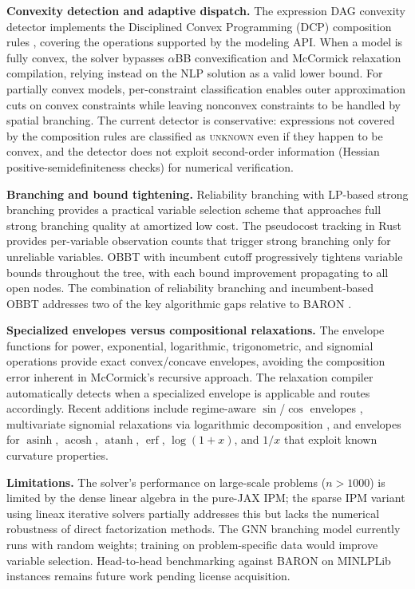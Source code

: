\documentclass[12pt,preprint]{article}
\begin{document}
\textbf{Convexity detection and adaptive dispatch.} The expression DAG convexity detector implements the Disciplined Convex Programming (DCP) composition rules \cite{Boyd2004}, covering the operations supported by the modeling API. When a model is fully convex, the solver bypasses $\alpha$BB convexification and McCormick relaxation compilation, relying instead on the NLP solution as a valid lower bound. For partially convex models, per-constraint classification enables outer approximation cuts on convex constraints while leaving nonconvex constraints to be handled by spatial branching. The current detector is conservative: expressions not covered by the composition rules are classified as \textsc{unknown} even if they happen to be convex, and the detector does not exploit second-order information (Hessian positive-semidefiniteness checks) for numerical verification.

\textbf{Branching and bound tightening.} Reliability branching \cite{Achterberg2005} with LP-based strong branching provides a practical variable selection scheme that approaches full strong branching quality at amortized low cost. The pseudocost tracking in Rust provides per-variable observation counts that trigger strong branching only for unreliable variables. OBBT with incumbent cutoff \cite{Gleixner2017} progressively tightens variable bounds throughout the tree, with each bound improvement propagating to all open nodes. The combination of reliability branching and incumbent-based OBBT addresses two of the key algorithmic gaps relative to BARON \cite{Tawarmalani2005}.

\textbf{Specialized envelopes versus compositional relaxations.} The envelope functions for power, exponential, logarithmic, trigonometric, and signomial operations provide exact convex/concave envelopes, avoiding the composition error inherent in McCormick's recursive approach. The relaxation compiler automatically detects when a specialized envelope is applicable and routes accordingly. Recent additions include regime-aware $\sin$/$\cos$ envelopes \cite{Locatelli2014}, multivariate signomial relaxations via logarithmic decomposition \cite{Maranas1997}, and envelopes for $\operatorname{asinh}$, $\operatorname{acosh}$, $\operatorname{atanh}$, $\operatorname{erf}$, $\log(1+x)$, and $1/x$ that exploit known curvature properties.

\textbf{Limitations.} The solver's performance on large-scale problems ($n > 1000$) is limited by the dense linear algebra in the pure-JAX IPM; the sparse IPM variant using lineax iterative solvers partially addresses this but lacks the numerical robustness of direct factorization methods. The GNN branching model currently runs with random weights; training on problem-specific data would improve variable selection. Head-to-head benchmarking against BARON on MINLPLib instances remains future work pending license acquisition.
\end{document}
